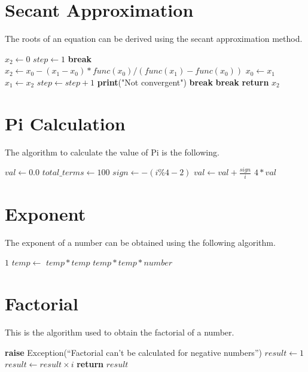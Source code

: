 \documentclass{report}
\begin{document}
\section{Secant Approximation}
The roots of an equation can be derived using the secant approximation method.
\break
\begin{algorithmic}[1]
    \State $x_2 \gets 0$
    \State $step \gets 1$
            \State \textbf{break}
        \EndIf
        \State $x_2 \gets x_0 - (x_1 - x_0) * func(x_0) / (func(x_1) - func(x_0))$
        \State $x_0 \gets x_1$
        \State $x_1 \gets x_2$
        \State $step \gets step + 1$
            \State \textbf{print}("Not convergent")
            \State \textbf{break}
        \EndIf
            \State \textbf{break}
        \EndIf
    \EndWhile
    \State \textbf{return} $x_2$
\EndFunction
\end{algorithmic}

\section{Pi Calculation}
The algorithm to calculate the value of Pi is the following.
\break
\begin{algorithmic}[1]
        \State $val \gets 0.0$
        \State $total\_terms \gets 100$
            \State $sign \gets -(i\%4-2)$
            \State $val \gets val + \frac{sign}{i}$
        \EndFor
        \State \Return $4 * val$
    \EndFunction
\end{algorithmic}

\section{Exponent}
The exponent of a number can be obtained using the following algorithm.
\break
\begin{algorithmic}[1]
        \State \Return $1$
    \EndIf
    \State $temp \gets$ 
        \State \Return $temp * temp$
    \Else
        \State \Return $temp * temp * number$
    \EndIf
\EndFunction
\end{algorithmic}

\section{Factorial}
This is the algorithm used to obtain the factorial of a number.
\break
\begin{algorithmic}[1]
    \State \textbf{raise} Exception(``Factorial can't be calculated for negative numbers'')
  \EndIf
  \State $result \gets 1$
    \State $result \gets result \times i$
  \EndFor
  \State \textbf{return} $result$
\EndFunction
\end{algorithmic}
\end{document}
